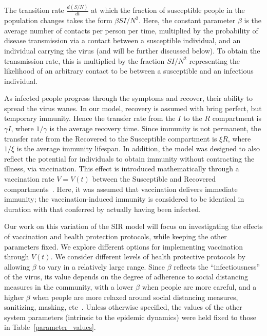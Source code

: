 \documentclass[10pt]{article}
\begin{document}
The transition rate $\frac{d(S/N)}{dt}$ at which the fraction of susceptible people in the population changes takes the form $\beta SI/N^2$.
Here, the constant parameter $\beta$ is the average number of contacts per person per time, multiplied by the probability of disease transmission via a contact between a susceptible individual, and an individual carrying the virus (and will be further discussed below). To obtain the transmission rate, this is multiplied by the fraction $SI/N^2$ representing the likelihood of an arbitrary contact to be between a susceptible and an infectious individual. 

As infected people progress through the symptoms and recover, their ability to spread the virus wanes. In our model, recovery  is assumed with bring perfect, but temporary immunity. Hence the transfer rate from the $I$ to the $R$ compartment is $\gamma I$, where $1/\gamma$ is the average recovery time. Since immunity is not permanent, the transfer rate from the Recovered to the Susceptible compartment is $\xi R$, where $1/\xi$ is the average immunity lifespan. In addition, the model was designed to also reflect the potential for individuals to obtain immunity without contracting the illness, via vaccination. This effect is introduced mathematically through a vaccination rate $V=V(t)$ between the Susceptible and Recovered compartments~\cite{chauhan2014stability}. Here, it was assumed that vaccination delivers immediate immunity; the vaccination-induced immunity is considered to be identical in duration with that conferred by actually having been infected. 

Our work on this variation of the SIR model will focus on investigating the effects of vaccination and health protection protocols, while keeping the other parameters fixed. We explore different options for implementing vaccination through $V(t)$. We consider different levels of health protective protocols by allowing $\beta$ to vary in a relatively large range. Since $\beta$ reflects the ``infectiousness'' of the virus, its value depends on the degree of adherence to social distancing measures in the community, with a lower $\beta$ when people are more careful, and a higher $\beta$ when people are more relaxed around social distancing measures, sanitizing, masking, etc~\cite{agrawal2016stability}. Unless otherwise specified, the values of the other system parameters (intrinsic to the epidemic dynamics) were held fixed to those in Table~\ref{parameter_values}.
\end{document}
